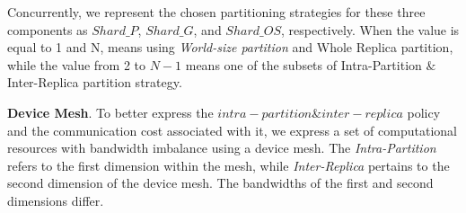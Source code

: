 Concurrently, we represent the chosen partitioning strategies for these three components as $Shard\_P$, $Shard\_G$, and $Shard\_OS$, respectively. When the value is equal to 1 and N, means using \emph{World-size partition} and {Whole Replica} partition, while the value from 2 to $N-1$ means one of the subsets of {Intra-Partition $\&$ Inter-Replica} partition strategy.

\noindent\textbf{Device Mesh}. To better express the $intra-partition$\&$inter-replica$ policy and the communication cost associated with it, we express a set of computational resources with bandwidth imbalance using a device mesh.  The \emph{Intra-Partition} refers to the first dimension within the mesh, while \emph{Inter-Replica} pertains to the second dimension of the device mesh. The bandwidths of the first and second dimensions differ.







